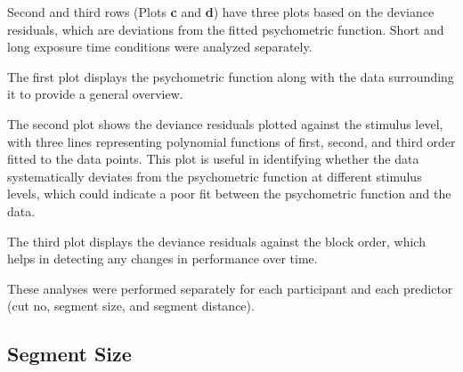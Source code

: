 \documentclass{article}
\begin{document}
Second and third rows (Plots \textbf{c} and \textbf{d}) have three plots based on the deviance residuals, which are deviations from the fitted psychometric function. Short and long exposure time conditions were analyzed separately.

The first plot displays the psychometric function along with the data surrounding it to provide a general overview. 

The second plot shows the deviance residuals plotted against the stimulus level, with three lines representing polynomial functions of first, second, and third order fitted to the data points. This plot is useful in identifying whether the data systematically deviates from the psychometric function at different stimulus levels, which could indicate a poor fit between the psychometric function and the data. 

The third plot displays the deviance residuals against the block order, which helps in detecting any changes in performance over time. 

These analyses were performed separately for each participant and each predictor (cut no, segment size, and segment distance).

\clearpage
\subsection{Segment Size}
\end{document}
